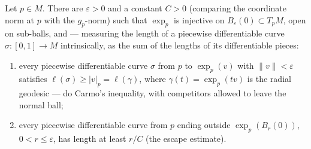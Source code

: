 \begin{lemma}
  \label{lem:dc-ch3-3-6-competitor}
  \leanok
  Let $p\in M$. There are $\varepsilon>0$ and a constant $C>0$ (comparing the
  coordinate norm at $p$ with the $g_p$-norm) such that $\exp_p$ is injective
  on $B_\varepsilon(0)\subset T_pM$, open on sub-balls, and — measuring the
  length of a piecewise differentiable curve $\sigma:[0,1]\to M$
  intrinsically, as the sum of the lengths of its differentiable pieces:
  \begin{enumerate}
  \item every piecewise differentiable curve $\sigma$ from $p$ to
    $\exp_p(v)$ with $\|v\|<\varepsilon$ satisfies
    $\ell(\sigma)\ge|v|_p=\ell(\gamma)$, where $\gamma(t)=\exp_p(tv)$ is the
    radial geodesic — do Carmo's inequality, with competitors allowed to
    leave the normal ball;
  \item every piecewise differentiable curve from $p$ ending outside
    $\exp_p(B_r(0))$, $0<r\le\varepsilon$, has length at least $r/C$ (the
    escape estimate).
  \end{enumerate}
\end{lemma}
